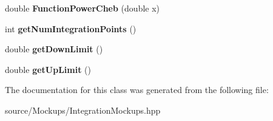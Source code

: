 \begin{DoxyCompactItemize}
\item 
\hypertarget{class_c___integration___mockup_a98ac3a8fa83fd6696e34061aecd94e9c}{double {\bfseries Function\-Power\-Cheb} (double x)}\label{class_c___integration___mockup_a98ac3a8fa83fd6696e34061aecd94e9c}

\item 
\hypertarget{class_c___integration___mockup_ac29856604fcf4791fd4dd459ab8dd020}{int {\bfseries get\-Num\-Integration\-Points} ()}\label{class_c___integration___mockup_ac29856604fcf4791fd4dd459ab8dd020}

\item 
\hypertarget{class_c___integration___mockup_a2c945ead423a0e422a0e5d81dd6056fe}{double {\bfseries get\-Down\-Limit} ()}\label{class_c___integration___mockup_a2c945ead423a0e422a0e5d81dd6056fe}

\item 
\hypertarget{class_c___integration___mockup_ae46f0b9c1ab11f106b54c54c200583b9}{double {\bfseries get\-Up\-Limit} ()}\label{class_c___integration___mockup_ae46f0b9c1ab11f106b54c54c200583b9}

\end{DoxyCompactItemize}


The documentation for this class was generated from the following file\-:\begin{DoxyCompactItemize}
\item 
source/\-Mockups/Integration\-Mockups.\-hpp\end{DoxyCompactItemize}
